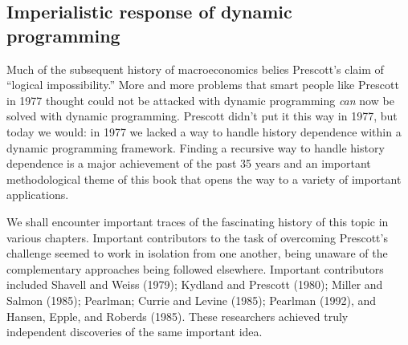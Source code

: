 \subsection{Imperialistic response of dynamic   programming}

Much of the subsequent history of macroeconomics
belies
Prescott's claim of ``logical impossibility.''
  More and more problems that smart
people like Prescott in 1977 thought could not be attacked
with dynamic programming {\it can\/} now   be solved with
dynamic programming.
Prescott didn't put it this way in 1977, but today we would:
in 1977 we lacked a way to handle history dependence
 within  a dynamic programming framework.
Finding a recursive way to
handle history dependence  is a major achievement of the past 35 years
and an important methodological theme of this book that opens
the way to a variety of important applications.

We shall encounter important traces of
the fascinating history of this topic in various chapters.  Important
contributors to the task of overcoming Prescott's challenge seemed to work in isolation
from one another, being unaware of the complementary approaches
being followed elsewhere. Important contributors included
 Shavell and Weiss (1979);
Kydland and Prescott (1980); Miller and Salmon (1985); Pearlman;
Currie and Levine (1985); Pearlman (1992), and Hansen, Epple, and
Roberds (1985). These researchers achieved truly independent
discoveries of the same important idea. 
 
 

